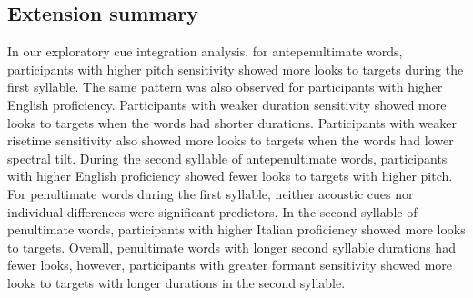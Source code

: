 \subsection{Extension summary}

In our exploratory cue integration analysis, for antepenultimate words, participants with higher pitch sensitivity showed more looks to targets during the first syllable. The same pattern was also observed for participants with higher English proficiency. Participants with weaker duration sensitivity showed more looks to targets when the words had shorter durations. Participants with weaker risetime sensitivity also showed more looks to targets when the words had lower spectral tilt. During the second syllable of antepenultimate words, participants with higher English proficiency showed fewer looks to targets with higher pitch. For penultimate words during the first syllable, neither acoustic cues nor individual differences were significant predictors. In the second syllable of penultimate words, participants with higher Italian proficiency showed more looks to targets. Overall, penultimate words with longer second syllable durations had fewer looks, however, participants with greater formant sensitivity showed more looks to targets with longer durations in the second syllable. 